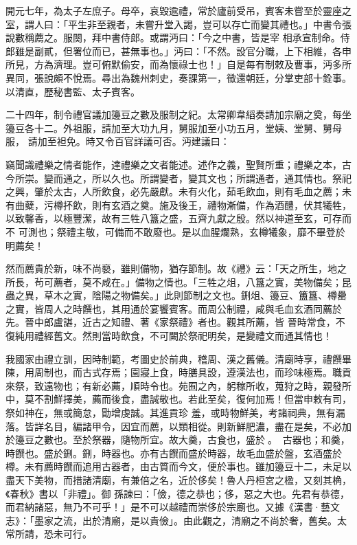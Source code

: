 \begin{pinyinscope}
 開元七年，為太子左庶子。母卒，哀毀逾禮，常於廬前受吊，賓客未嘗至於靈座之室，謂人曰：「平生非至親者，未嘗升堂入謁，豈可以存亡而變其禮也。」中書令張說數稱薦之。服闋，拜中書侍郎。或謂沔曰：「今之中書，皆是宰
 相承宣制命。侍郎雖是副貳，但署位而已，甚無事也。」沔曰：「不然。設官分職，上下相維，各申所見，方為濟理。豈可俯默偷安，而為懷祿士也！」自是每有制敕及曹事，沔多所異同，張說頗不悅焉。尋出為魏州刺史，奏課第一，徵還朝廷，分掌吏部十銓事。以清直，歷秘書監、太子賓客。



 二十四年，制令禮官議加籩豆之數及服制之紀。太常卿韋縚奏請加宗廟之奠，每坐籩豆各十二。外祖服，請加至大功九月，舅服加至小功五月，堂姨、堂舅、舅母服，
 請加至袒免。時又令百官詳議可否。沔建議曰：



 竊聞識禮樂之情者能作，達禮樂之文者能述。述作之義，聖賢所重；禮樂之本，古今所崇。變而通之，所以久也。所謂變者，變其文也；所謂通者，通其情也。祭祀之興，肇於太古，人所飲食，必先嚴獻。未有火化，茹毛飲血，則有毛血之薦；未有曲糵，污樽抔飲，則有玄酒之奠。施及後王，禮物漸備，作為酒醴，伏其犧牲，以致馨香，以極豐潔，故有三牲八簋之盛，五齊九獻之殷。然以神道至玄，可存而不
 可測也；祭禮主敬，可備而不敢廢也。是以血腥爛熟，玄樽犧象，靡不畢登於明薦矣！



 然而薦貴於新，味不尚褻，雖則備物，猶存節制。故《禮》云：「天之所生，地之所長，茍可薦者，莫不咸在。」備物之情也。「三牲之俎，八簋之實，美物備矣；昆蟲之異，草木之實，陰陽之物備矣。」此則節制之文也。鉶俎、籩豆、簠簋、樽罍之實，皆周人之時饌也，其用通於宴饗賓客。而周公制禮，咸與毛血玄酒同薦於先。晉中郎盧諶，近古之知禮、著《家祭禮》者也。觀其所薦，皆
 晉時常食，不復純用禮經舊文。然則當時飲食，不可闕於祭祀明矣，是變禮文而通其情也！



 我國家由禮立訓，因時制範，考圖史於前典，稽周、漢之舊儀。清廟時享，禮饌畢陳，用周制也，而古式存焉；園寢上食，時膳具設，遵漢法也，而珍味極焉。職貢來祭，致遠物也；有新必薦，順時令也。苑囿之內，躬稼所收，蒐狩之時，親發所中，莫不割鮮擇美，薦而後食，盡誠敬也。若此至矣，復何加焉！但當申敕有司，祭如神在，無或簡怠，勖增虔誠。其進貢珍
 羞，或時物鮮美，考諸祠典，無有漏落。皆詳名目，編諸甲令，因宜而薦，以類相從。則新鮮肥濃，盡在是矣，不必加於籩豆之數也。至於祭器，隨物所宜。故大羹，古食也，盛於。，古器也；和羹，時饌也。盛於鉶。鉶，時器也。亦有古饌而盛於時器，故毛血盛於盤，玄酒盛於樽。未有薦時饌而追用古器者，由古質而今文，便於事也。雖加籩豆十二，未足以盡天下美物，而措諸清廟，有兼倍之名，近於侈矣！魯人丹桓宮之楹，又刻其桷，《春秋》書以「非禮」。御
 孫諫曰：「儉，德之恭也；侈，惡之大也。先君有恭德，而君納諸惡，無乃不可乎！」是不可以越禮而崇侈於宗廟也。又據《漢書·藝文志》：「墨家之流，出於清廟，是以貴儉」。由此觀之，清廟之不尚於奢，舊矣。太常所請，恐未可行。




\end{pinyinscope}
